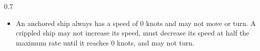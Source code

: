\begin{twocolumntablefloat}
{\begin{tablenote}{0.7\linewidth}
\begin{itemize}
        \item An anchored ship always has a speed of 0 knots and may not move or turn. A crippled ship may not increase its speed, must decrease its speed at half the maximum rate until it reaches 0 knots, and may not turn.

    \end{itemize}
\end{tablenote}

}
\end{twocolumntablefloat}
